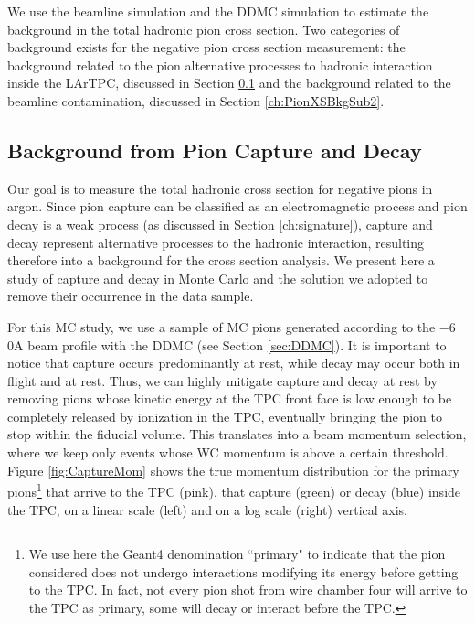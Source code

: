 We use the beamline simulation and the DDMC simulation to estimate the background in the total hadronic pion cross section. Two categories of background exists for the negative pion cross section measurement: the background related to the pion alternative processes to hadronic interaction inside the LArTPC, discussed in Section \ref{ch:CaptureAndDecay} and the background related to the beamline contamination, discussed in Section \ref{ch:PionXSBkgSub2}.

\subsection{Background from Pion Capture and Decay}\label{ch:CaptureAndDecay}
Our goal is to measure the total hadronic cross section for negative pions in argon. Since pion capture can be classified as an electromagnetic process and pion decay is a weak process (as discussed in Section \ref{ch:signature}),  capture and decay represent alternative processes to the hadronic interaction, resulting therefore into a background for the cross section analysis. We present here a study of capture and decay in Monte Carlo and the solution we adopted to remove their occurrence in the data sample. 

For this MC study, we use a sample of  MC pions generated according to the  $-6$0A beam profile with the DDMC (see Section \ref{sec:DDMC}). It is important to notice that capture occurs predominantly at rest, while decay may occur both in flight and at rest. Thus, we can highly mitigate capture and decay at rest by removing pions whose kinetic energy at the TPC front face is low enough to be completely released by ionization in the TPC, eventually bringing the pion to stop within the fiducial volume. This translates into a beam momentum selection, where we keep only events whose WC momentum is above a certain threshold. 
Figure \ref{fig:CaptureMom} shows the true momentum distribution for the primary pions\footnote{We use here the Geant4 denomination ``primary" to indicate that the pion considered does not undergo interactions modifying its energy before getting to the TPC. In fact, not every pion shot from wire chamber four will arrive to the TPC as primary,  some will decay or interact before the TPC.}  that arrive to the TPC (pink), that capture (green) or decay (blue) inside the TPC, on a linear scale (left) and on a log scale (right) vertical axis. 




